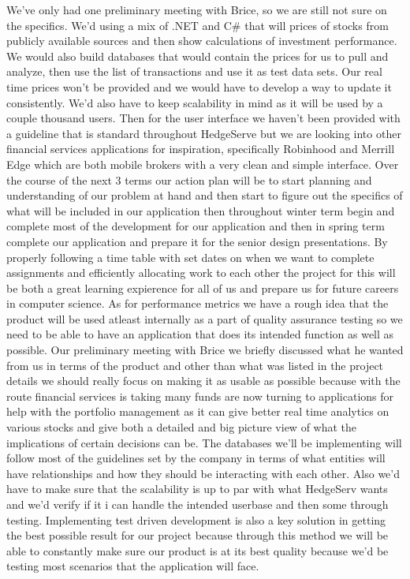 \documentclass[onecolumn, draftclsnofoot,10pt, compsoc]{IEEEtran}
\begin{document}
 We've only had one preliminary meeting with Brice, so we are still not sure on the specifics. We'd using a mix of .NET and C# that will prices of stocks from publicly available sources and then show calculations of investment performance. We would also build databases that would contain the prices for us to pull and analyze, then use the list of transactions and use it as test data sets.  Our real time prices won't be provided and we would have to develop a way to update it consistently. We'd also have to keep scalability in mind as it will be used by a couple thousand users. Then for the user interface we haven't been provided with a guideline that is standard throughout HedgeServe but we are looking into other financial services applications for inspiration, specifically Robinhood and Merrill Edge which are both mobile brokers with a very clean and simple interface. Over the course of the next 3 terms our action plan will be to start planning and understanding of our problem at hand and then start to figure out the specifics of what will be included in our application then throughout winter term begin and complete most of the development for our application and then in spring term complete our application and prepare it for the senior design presentations. By properly following a time table with set dates on when we want to complete assignments and efficiently allocating work to each other the project for this will be both a great learning expierence for all of us and prepare us for future careers in computer science. As for performance metrics we have a rough idea that the product will be used atleast internally as a part of quality assurance testing so we need to be able to have an application that does its intended function as well as possible. Our preliminary meeting with Brice we briefly discussed what he wanted from us in terms of the product and other than what was listed in the project details we should really focus on making it as usable as possible because with the route financial services is taking many funds are now turning to applications for help with the portfolio management as it can give better real time analytics on various stocks and give both a detailed and big picture view of what the implications of certain decisions can be. The databases we'll be implementing will follow most of the guidelines set by the company in terms of what entities will have relationships and how they should be interacting with each other. Also we'd have to make sure that the scalability is up to par with what HedgeServ wants and we'd verify if it i can handle the intended userbase and then some through testing. Implementing test driven development is also a key solution in getting the best possible result for our project because through this method we will be able to constantly make sure our product is at its best quality because we'd be testing most scenarios that the application will face.  
	
\end{document}
